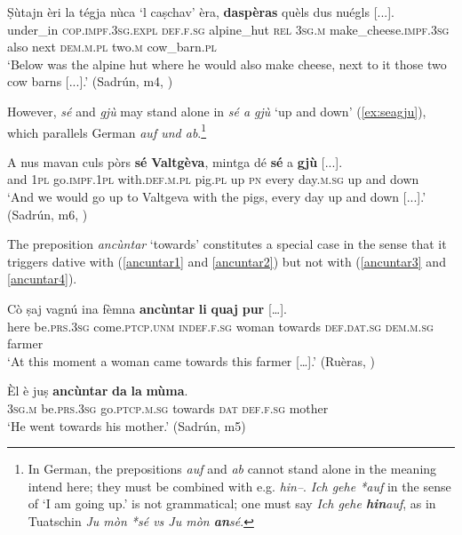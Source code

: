 \ea
\label{ex:dasperas}
\gll Ṣùtajn èri la tégja nùca `l caṣchav' èra, \textbf{daspèras} quèls dus nuégls [...].\\
under\_in \textsc{cop.impf.3sg.expl} \textsc{def.f.sg} alpine\_hut \textsc{rel} \textsc{3sg.m} make\_cheese.\textsc{impf.3sg} also next \textsc{dem.m.pl} two.\textsc{m} cow\_barn.\textsc{pl} \\
\glt `Below was the alpine hut where he would also make cheese, next to it those two cow barns [...].' (Sadrún, m4, )
\z

However, \textit{sé} and \textit{gjù} may stand alone in \textit{sé a gjù} `up and down' (\ref{ex:seagju}), which parallels German \textit{auf und ab}.\footnote{In German, the prepositions \textit{auf} and \textit{ab} cannot stand alone in the meaning intend here; they must be combined with e.g. \textit{hin--}. \textit{Ich gehe *auf}  in the sense of `I am going up.' is not grammatical; one must say\textit{ Ich gehe \textbf{hin}auf}, as in Tuatschin\textit{ Ju mòn *sé vs Ju mòn \textbf{an}sé}.}

\ea
\label{ex:seagju}
\gll    A nus mavan culs pòrs \textbf{sé} \textbf{Valtgèva}, mintga dé \textbf{sé} a \textbf{gjù} [...].\\
and\textbf{} \textsc{1pl}  go.\textsc{impf.1pl} with.\textsc{def.m.pl} pig.\textsc{pl} up \textsc{pn} every day.\textsc{m.sg} up and down \\
\glt `And we would go up to Valtgeva with the pigs, every day up and down [...].' (Sadrún, m6, )
\z

The preposition \textit{ancùntar} `towards' constitutes a special case in the sense that it triggers dative with  (\ref{ancuntar1} and \ref{ancuntar2})  but not with  (\ref{ancuntar3} and \ref{ancuntar4}).

\ea
\label{ancuntar1}
\gll Cò ṣaj	vagnú ina fèmna \textbf{ancùntar} \textbf{li}	\textbf{quaj} \textbf{pur} […].\\
here be.\textsc{prs.3sg} come.\textsc{ptcp.unm} \textsc{indef.f.sg} woman towards \textsc{def.dat.sg} \textsc{dem.m.sg} farmer \\
\glt `At this moment a woman came towards this farmer […].' (Ruèras, \citealt[64]{Büchli1966})
\z

\ea
\label{ancuntar2}
\gll Èl è juṣ \textbf{ancùntar} \textbf{da} \textbf{la} \textbf{mùma}.\\
\textsc{3sg.m} be.\textsc{prs.3sg} go.\textsc{ptcp.m.sg} towards \textsc{dat} \textsc{def.f.sg} mother\\
\glt `He went towards his mother.' (Sadrún, m5)
\z

